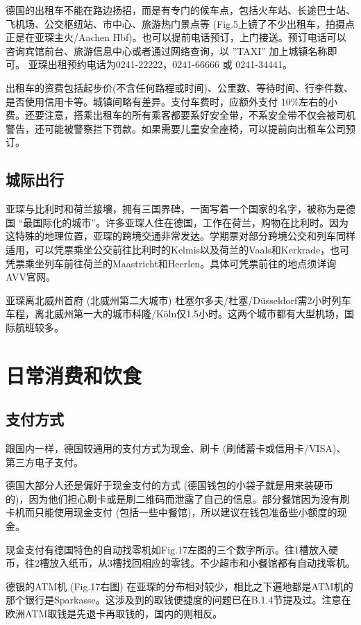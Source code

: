     德国的出租车不能在路边扬招，而是有专门的候车点，包括火车站、长途巴士站、飞机场、公交枢纽站、市中心、旅游热门景点等 (Fig.5上镜了不少出租车，拍摄点正是在亚琛主火/Aachen Hbf)。也可以提前电话预订，上门接送。预订电话可以咨询宾馆前台、旅游信息中心或者通过网络查询，以 ”TAXI” 加上城镇名称即可。 亚琛出租预约电话为0241-22222，0241-66666 或 0241-34441。

    出租车的资费包括起步价(不含任何路程或时间)、公里数、等待时间、行李件数、是否使用信用卡等。城镇间略有差异。支付车费时，应额外支付 10\%左右的小费。还要注意，搭乘出租车的所有乘客都要系好安全带，不系安全带不仅会被司机警告，还可能被警察拦下罚款。如果需要儿童安全座椅，可以提前向出租车公司预订。

  \subsection{城际出行}

    亚琛与比利时和荷兰接壤，拥有三国界碑，一面写着一个国家的名字，被称为是德国 “最国际化的城市”。许多亚琛人住在德国，工作在荷兰，购物在比利时。因为这特殊的地理位置，亚琛的跨境交通非常发达。学期票对部分跨境公交和列车同样适用，可以凭票乘坐公交前往比利时的Kelmis以及荷兰的Vaals和Kerkrade，也可凭票乘坐列车前往荷兰的Maastricht和Heerlen。具体可凭票前往的地点须详询AVV官网。

    亚琛离北威州首府 (北威州第二大城市) 杜塞尔多夫/杜塞/Düsseldorf需2小时列车车程，离北威州第一大的城市科隆/Köln仅1.5小时。这两个城市都有大型机场，国际航班较多。

\section{日常消费和饮食}

  \subsection{支付方式}

    跟国内一样，德国较通用的支付方式为现金、刷卡 (刷储蓄卡或信用卡/VISA)、第三方电子支付。

    德国大部分人还是偏好于现金支付的方式 (德国钱包的小袋子就是用来装硬币的)，因为他们担心刷卡或是刷二维码而泄露了自己的信息。部分餐馆因为没有刷卡机而只能使用现金支付 (包括一些中餐馆)，所以建议在钱包准备些小额度的现金。

    现金支付有德国特色的自动找零机如Fig.17左图的三个数字所示。往1槽放入硬币，往2槽放入纸币，从3槽找回相应的零钱。不少超市和小餐馆都有自动找零机。

    德银的ATM机 (Fig.17右图) 在亚琛的分布相对较少，相比之下遍地都是ATM机的那个银行是Sparkasse。这涉及到的取钱便捷度的问题已在B.1.4节提及过。注意在欧洲ATM取钱是先退卡再取钱的，国内的则相反。

